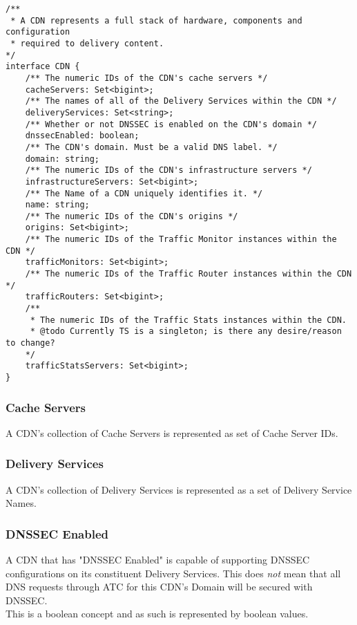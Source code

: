 \begin{codelisting}
\label{code:datamodel:cdn}
\begin{verbatim}
/**
 * A CDN represents a full stack of hardware, components and configuration
 * required to delivery content.
*/
interface CDN {
	/** The numeric IDs of the CDN's cache servers */
	cacheServers: Set<bigint>;
	/** The names of all of the Delivery Services within the CDN */
	deliveryServices: Set<string>;
	/** Whether or not DNSSEC is enabled on the CDN's domain */
	dnssecEnabled: boolean;
	/** The CDN's domain. Must be a valid DNS label. */
	domain: string;
	/** The numeric IDs of the CDN's infrastructure servers */
	infrastructureServers: Set<bigint>;
	/** The Name of a CDN uniquely identifies it. */
	name: string;
	/** The numeric IDs of the CDN's origins */
	origins: Set<bigint>;
	/** The numeric IDs of the Traffic Monitor instances within the CDN */
	trafficMonitors: Set<bigint>;
	/** The numeric IDs of the Traffic Router instances within the CDN */
	trafficRouters: Set<bigint>;
	/**
	 * The numeric IDs of the Traffic Stats instances within the CDN.
	 * @todo Currently TS is a singleton; is there any desire/reason to change?
	*/
	trafficStatsServers: Set<bigint>;
}
\end{verbatim}
\end{codelisting}

\subsubsection{Cache Servers}
A CDN's collection of Cache Servers is represented as set of Cache Server IDs.

\subsubsection{Delivery Services}
A CDN's collection of Delivery Services is represented as a set of Delivery
Service Names.

\subsubsection{DNSSEC Enabled}
A CDN that has "DNSSEC Enabled" is capable of supporting DNSSEC configurations
on its constituent Delivery Services. This does \emph{not} mean that all DNS
requests through ATC for this CDN's Domain will be secured with DNSSEC.\\
This is a boolean concept and as such is represented by boolean values.


